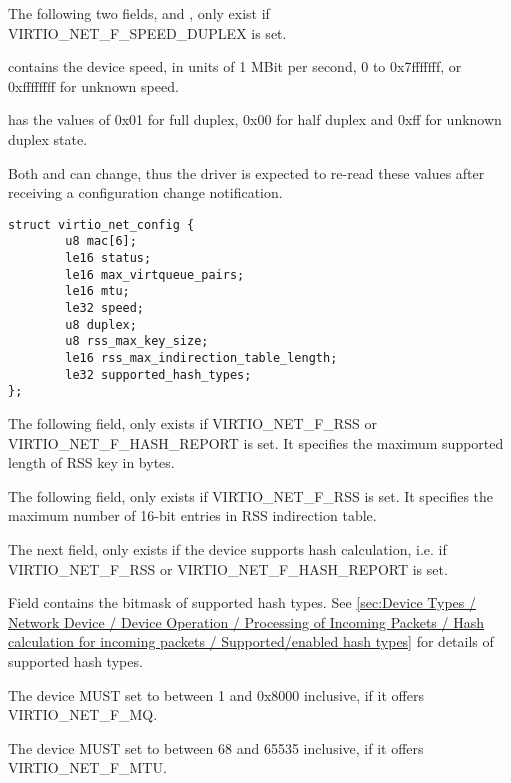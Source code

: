 The following two fields,  and , only
exist if VIRTIO_NET_F_SPEED_DUPLEX is set.

 contains the device speed, in units of 1 MBit per
second, 0 to 0x7fffffff, or 0xffffffff for unknown speed.

 has the values of 0x01 for full duplex, 0x00 for
half duplex and 0xff for unknown duplex state.

Both  and  can change, thus the driver
is expected to re-read these values after receiving a
configuration change notification.

\begin{lstlisting}
struct virtio_net_config {
        u8 mac[6];
        le16 status;
        le16 max_virtqueue_pairs;
        le16 mtu;
        le32 speed;
        u8 duplex;
        u8 rss_max_key_size;
        le16 rss_max_indirection_table_length;
        le32 supported_hash_types;
};
\end{lstlisting}
The following field,  only exists if VIRTIO_NET_F_RSS or VIRTIO_NET_F_HASH_REPORT is set.
It specifies the maximum supported length of RSS key in bytes.

The following field,  only exists if VIRTIO_NET_F_RSS is set.
It specifies the maximum number of 16-bit entries in RSS indirection table.

The next field,  only exists if the device supports hash calculation,
i.e. if VIRTIO_NET_F_RSS or VIRTIO_NET_F_HASH_REPORT is set.

Field  contains the bitmask of supported hash types.
See \ref{sec:Device Types / Network Device / Device Operation / Processing of Incoming Packets / Hash calculation for incoming packets / Supported/enabled hash types} for details of supported hash types.


The device MUST set  to between 1 and 0x8000 inclusive,
if it offers VIRTIO_NET_F_MQ.

The device MUST set  to between 68 and 65535 inclusive,
if it offers VIRTIO_NET_F_MTU.

